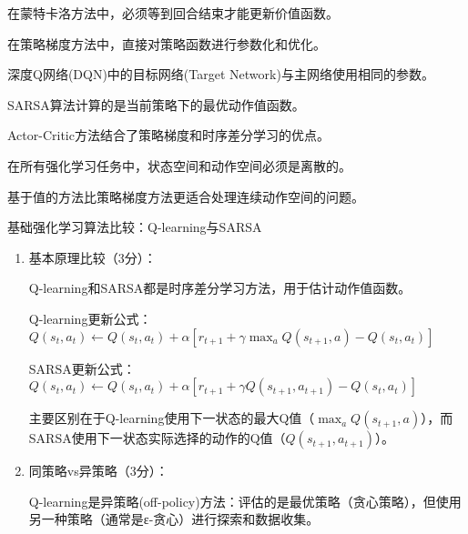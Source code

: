 \documentclass[zihao=5,answers]{BHCexam}
\begin{document}
\begin{questions}
\question 在蒙特卡洛方法中，必须等到回合结束才能更新价值函数。

\question 在策略梯度方法中，直接对策略函数进行参数化和优化。

\question 深度Q网络(DQN)中的目标网络(Target Network)与主网络使用相同的参数。

\question SARSA算法计算的是当前策略下的最优动作值函数。

\question Actor-Critic方法结合了策略梯度和时序差分学习的优点。

\question 在所有强化学习任务中，状态空间和动作空间必须是离散的。

\question 基于值的方法比策略梯度方法更适合处理连续动作空间的问题。

\jianda

\question[10] 基础强化学习算法比较：Q-learning与SARSA
\begin{solution}
\begin{enumerate}
    \item 基本原理比较（3分）：
    
    Q-learning和SARSA都是时序差分学习方法，用于估计动作值函数。
    
    Q-learning更新公式：$Q(s_t,a_t) \leftarrow Q(s_t,a_t) + \alpha [r_{t+1} + \gamma \max_a Q(s_{t+1},a) - Q(s_t,a_t)]$
    
    SARSA更新公式：$Q(s_t,a_t) \leftarrow Q(s_t,a_t) + \alpha [r_{t+1} + \gamma Q(s_{t+1},a_{t+1}) - Q(s_t,a_t)]$
    
    主要区别在于Q-learning使用下一状态的最大Q值（$\max_a Q(s_{t+1},a)$），而SARSA使用下一状态实际选择的动作的Q值（$Q(s_{t+1},a_{t+1})$）。
    
    \item 同策略vs异策略（3分）：
    
    Q-learning是异策略(off-policy)方法：评估的是最优策略（贪心策略），但使用另一种策略（通常是ε-贪心）进行探索和数据收集。
    

\end{enumerate}
\end{solution}
\end{questions}
\end{document}
